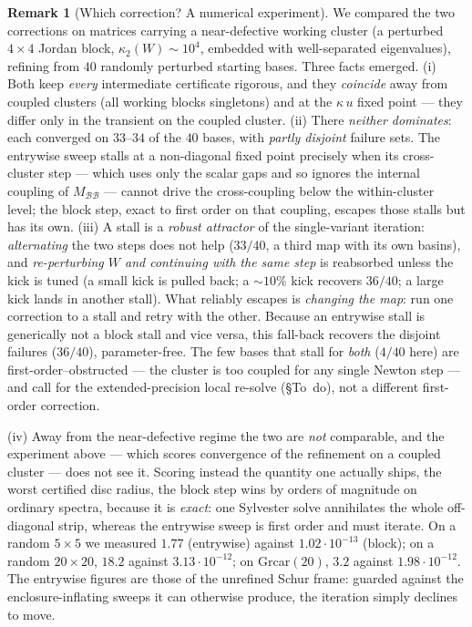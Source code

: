 \documentclass[11pt,a4paper]{article}
\theoremstyle{plain}
\theoremstyle{definition}
\newtheorem{remark}[theorem]{Remark}
\begin{document}
\begin{remark}[Which correction? A numerical experiment]\label{rem:exp}
We compared the two corrections on matrices carrying a near-defective working cluster
(a perturbed $4\times4$ Jordan block, $\kappa_2(W)\sim10^4$, embedded with
well-separated eigenvalues), refining from $40$ randomly perturbed starting bases.
Three facts emerged. (i) Both keep \emph{every} intermediate certificate rigorous, and
they \emph{coincide} away from coupled clusters (all working blocks singletons) and at
the $\kappa\,u$ fixed point --- they differ only in the transient on the coupled
cluster. (ii) There \emph{neither dominates}: each converged on $33$--$34$ of the $40$
bases, with \emph{partly disjoint} failure sets. The entrywise sweep stalls at a
non-diagonal fixed point precisely when its cross-cluster step --- which uses only the
scalar gaps and so ignores the internal coupling of $M_{\mathcal B\mathcal B}$ ---
cannot drive the cross-coupling below the within-cluster level; the block step, exact
to first order on that coupling, escapes those stalls but has its own. (iii) A stall is
a \emph{robust attractor} of the single-variant iteration: \emph{alternating} the two
steps does not help ($33/40$, a third map with its own basins), and \emph{re-perturbing
$W$ and continuing with the same step} is reabsorbed unless the kick is tuned (a small
kick is pulled back; a $\sim\!10\%$ kick recovers $36/40$; a large kick lands in
another stall). What reliably escapes is \emph{changing the map}: run one correction to
a stall and retry with the other. Because an entrywise stall is generically not a block
stall and vice versa, this fall-back recovers the disjoint failures
($36/40$), parameter-free. The few bases that stall for \emph{both} ($4/40$ here) are
first-order--obstructed --- the cluster is too coupled for any single Newton step ---
and call for the extended-precision local re-solve (\S To~do), not a different
first-order correction.

(iv) Away from the near-defective regime the two are \emph{not} comparable, and the
experiment above --- which scores convergence of the refinement on a coupled cluster ---
does not see it. Scoring instead the quantity one actually ships, the worst certified
disc radius, the block step wins by orders of magnitude on ordinary spectra, because it
is \emph{exact}: one Sylvester solve annihilates the whole off-diagonal strip, whereas
the entrywise sweep is first order and must iterate. On a random $5\times5$ we measured
$1.77$ (entrywise) against $1.02\cdot10^{-13}$ (block); on a random $20\times20$, $18.2$
against $3.13\cdot10^{-12}$; on Grcar$(20)$, $3.2$ against $1.98\cdot10^{-12}$. The
entrywise figures are those of the unrefined Schur frame: guarded against the
enclosure-inflating sweeps it can otherwise produce, the iteration simply declines to
move.


\end{remark}
\end{document}
